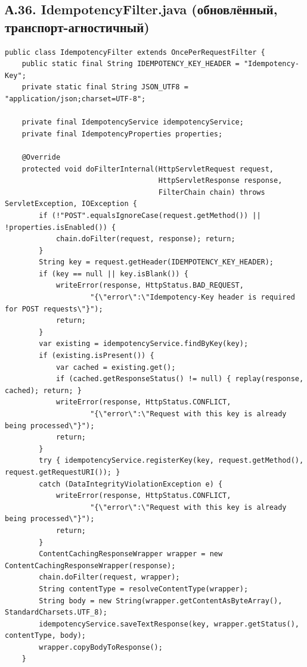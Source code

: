 \subsection*{А.36. IdempotencyFilter.java (обновлённый, транспорт-агностичный)}
\begin{lstlisting}[caption={Фильтр сохраняет реальный Content-Type и пишет байты через OutputStream}]
public class IdempotencyFilter extends OncePerRequestFilter {
    public static final String IDEMPOTENCY_KEY_HEADER = "Idempotency-Key";
    private static final String JSON_UTF8 = "application/json;charset=UTF-8";

    private final IdempotencyService idempotencyService;
    private final IdempotencyProperties properties;

    @Override
    protected void doFilterInternal(HttpServletRequest request,
                                    HttpServletResponse response,
                                    FilterChain chain) throws ServletException, IOException {
        if (!"POST".equalsIgnoreCase(request.getMethod()) || !properties.isEnabled()) {
            chain.doFilter(request, response); return;
        }
        String key = request.getHeader(IDEMPOTENCY_KEY_HEADER);
        if (key == null || key.isBlank()) {
            writeError(response, HttpStatus.BAD_REQUEST,
                    "{\"error\":\"Idempotency-Key header is required for POST requests\"}");
            return;
        }
        var existing = idempotencyService.findByKey(key);
        if (existing.isPresent()) {
            var cached = existing.get();
            if (cached.getResponseStatus() != null) { replay(response, cached); return; }
            writeError(response, HttpStatus.CONFLICT,
                    "{\"error\":\"Request with this key is already being processed\"}");
            return;
        }
        try { idempotencyService.registerKey(key, request.getMethod(), request.getRequestURI()); }
        catch (DataIntegrityViolationException e) {
            writeError(response, HttpStatus.CONFLICT,
                    "{\"error\":\"Request with this key is already being processed\"}");
            return;
        }
        ContentCachingResponseWrapper wrapper = new ContentCachingResponseWrapper(response);
        chain.doFilter(request, wrapper);
        String contentType = resolveContentType(wrapper);
        String body = new String(wrapper.getContentAsByteArray(), StandardCharsets.UTF_8);
        idempotencyService.saveTextResponse(key, wrapper.getStatus(), contentType, body);
        wrapper.copyBodyToResponse();
    }


\end{lstlisting}
